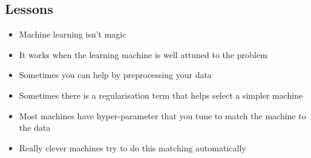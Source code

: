 \begin{slide}
\section{Lessons}

\begin{PauseHighLight}
  \begin{itemize}
  \item Machine learning isn't magic\pause
  \item It works when the learning machine is well attuned to the
    problem\pause
  \item Sometimes you can help by preprocessing your data\pause
  \item Sometimes there is a regularisation term that helps select a
    simpler machine\pause
  \item Most machines have hyper-parameter that you tune to match the
    machine to the data\pause
  \item Really clever machines try to do this matching automatically\pause
  \end{itemize}
\end{PauseHighLight}

\end{slide}



